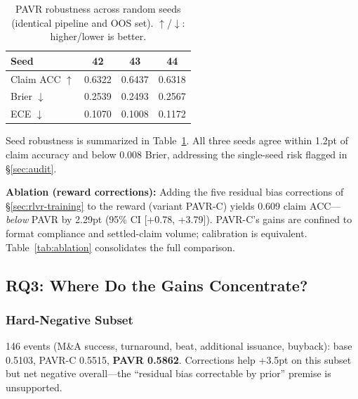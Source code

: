 \documentclass[sigconf, anonymous, review]{acmart}
\begin{document}
\begin{table}[t]
\centering\small
\caption{PAVR robustness across random seeds (identical pipeline and OOS set). $\uparrow$/$\downarrow$: higher/lower is better.}
\label{tab:seeds}
\begin{tabular}{@{}lccc@{}}
\toprule
Seed & 42 & 43 & 44 \\
\midrule
Claim ACC $\uparrow$ & 0.6322 & 0.6437 & 0.6318 \\
Brier $\downarrow$ & 0.2539 & 0.2493 & 0.2567 \\
ECE $\downarrow$ & 0.1070 & 0.1008 & 0.1172 \\
\bottomrule
\end{tabular}
\end{table}

Seed robustness is summarized in Table~\ref{tab:seeds}. All three seeds agree within 1.2pt of claim accuracy and below 0.008 Brier, addressing the single-seed risk flagged in \S\ref{sec:audit}.

\textbf{Ablation (reward corrections):} Adding the five residual bias corrections of \S\ref{sec:rlvr-training} to the reward (variant PAVR-C) yields 0.609 claim ACC---\emph{below} PAVR by 2.29pt (95\% CI [+0.78, +3.79]). PAVR-C's gains are confined to format compliance and settled-claim volume; calibration is equivalent. Table~\ref{tab:ablation} consolidates the full comparison.

\subsection{RQ3: Where Do the Gains Concentrate?}
\label{sec:analysis}

\subsubsection{Hard-Negative Subset}

146 events (M\&A success, turnaround, beat, additional issuance, buyback): base 0.5103, PAVR-C 0.5515, \textbf{PAVR 0.5862}. Corrections help +3.5pt on this subset but net negative overall---the ``residual bias correctable by prior'' premise is unsupported.
\end{document}
